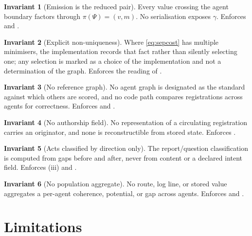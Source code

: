 \documentclass[11pt,a4paper]{article}
\theoremstyle{clstyle}
\theoremstyle{definition}
\newtheorem{binv}{Invariant}
\theoremstyle{remark}
\newcommand{\rec}{m}
\newcommand{\Psy}{\Psi}                  %
\newcommand{\traj}{\gamma}               %
\newcommand{\term}{v}                    %
\begin{document}
\begin{binv}[Emission is the reduced pair]
\label{binv:emission}
Every value crossing the agent boundary factors through
$\pi(\Psy)=(\term,\rec)$. No serialisation exposes $\traj$. Enforces
 and .
\end{binv}

\begin{binv}[Explicit non-uniqueness]
\label{binv:tiebreak}
Where \eqref{eq:sepcost} has multiple minimisers, the implementation records
that fact rather than silently selecting one; any selection is marked as a
choice of the implementation and not a determination of the graph. Enforces
the reading of .
\end{binv}

\begin{binv}[No reference graph]
\label{binv:noreference}
No agent graph is designated as the standard against which others are
scored, and no code path compares registrations across agents for
correctness. Enforces  and .
\end{binv}

\begin{binv}[No authorship field]
\label{binv:noauthor}
No representation of a circulating registration carries an originator, and
none is reconstructible from stored state. Enforces .
\end{binv}

\begin{binv}[Acts classified by direction only]
\label{binv:direction}
The report/question classification is computed from gaps before and after,
never from content or a declared intent field. Enforces
(iii) and .
\end{binv}

\begin{binv}[No population aggregate]
\label{binv:noaggregate}
No route, log line, or stored value aggregates a per-agent coherence,
potential, or gap across agents. Enforces  and
.
\end{binv}

\section{Limitations}
\label{sec:limitations}
\end{document}
